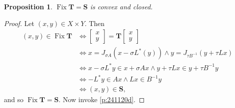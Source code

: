 \documentclass{article}
\providecommand{\siff}{\Leftrightarrow}
\newcommand{\Fix}{\ensuremath{\operatorname{Fix}}}
\newcommand{\bT}{\ensuremath{{\mathbf{T}}}}
\newcommand{\bKT}{\ensuremath{{\mathbf{S}}}}
\newtheorem{proposition}[theorem]{Proposition}
\begin{document}
\begin{proposition}\label{p:CPpd}
$\Fix \bT = \bKT$ is convex and closed. 
\end{proposition}
\begin{proof}
Let $(x,y)\in X\times Y$. Then 
\begin{subequations}
\begin{align}
(x,y)\in \Fix \bT
&\siff
\begin{bmatrix}
x\\y
\end{bmatrix}
=\bT\begin{bmatrix}
x\\y 
\end{bmatrix}\\
&\siff
x=J_{\sigma A}(x-\sigma L^*(y)) \land 
y=J_{\tau B^{-1}}(y+\tau Lx)\\
&\siff 
x-\sigma L^*y\in x+\sigma Ax \land 
y+\tau Lx\in y+\tau B^{-1}y\\
&\siff -L^*y\in Ax \land 
Lx\in B^{-1}y\\
&\siff (x,y)\in \bKT,
\end{align}
\end{subequations}
and so $\Fix\bT = \bKT$. 
Now invoke \cref{p:241120d}. 
\end{proof}
\end{document}
